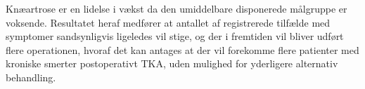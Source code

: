Knæartrose er en lidelse i vækst da den umiddelbare disponerede målgruppe er voksende. Resultatet heraf medfører at antallet af registrerede tilfælde med symptomer sandsynligvis ligeledes vil stige, og der i fremtiden vil bliver udført flere operationen, hvoraf det kan antages at der vil forekomme flere patienter med kroniske smerter postoperativt TKA, uden mulighed for yderligere alternativ behandling.

